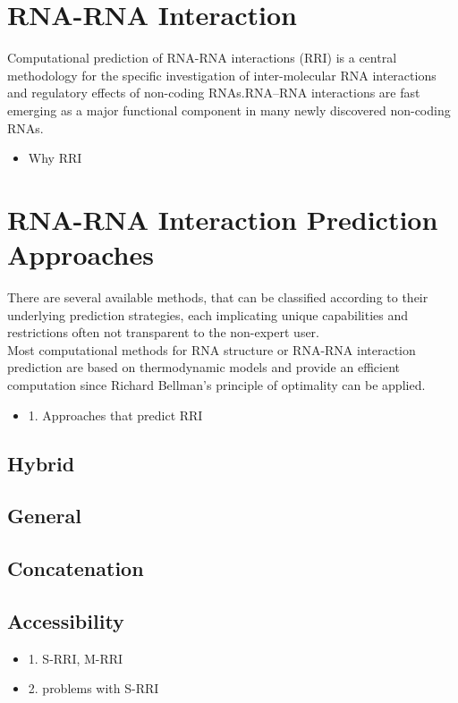 \documentclass[twoside,a4paper]{report}
\begin{document}
	
	\section{RNA-RNA Interaction}
 	Computational prediction of RNA-RNA interactions (RRI) is a central methodology for the specific investigation of inter-molecular RNA interactions and regulatory effects of non-coding RNAs.RNA–RNA interactions are fast emerging as a major functional component in many newly discovered non-coding RNAs.
 	
 	\begin{itemize}
 	\item Why RRI
 	\end{itemize}

	\section{RNA-RNA Interaction Prediction Approaches}
	There are several available methods, that can be classified according to their underlying prediction strategies, each implicating unique capabilities and restrictions often not transparent to the non-expert user.\\ 
	Most computational methods for RNA structure or RNA-RNA interaction prediction
	are based on thermodynamic models and provide an efficient computation since Richard Bellman’s principle of optimality \cite{raden2018interactive} can be applied.
	
	\begin{itemize}
	\item 1. Approaches that predict RRI
	\end{itemize}
	
	\subsection{Hybrid}
	\subsection{General}
	\subsection{Concatenation}
	\subsection{Accessibility}
		\begin{itemize}
		\item 1. S-RRI, M-RRI
		\item 2. problems with S-RRI
	    \end{itemize}
\end{document}
